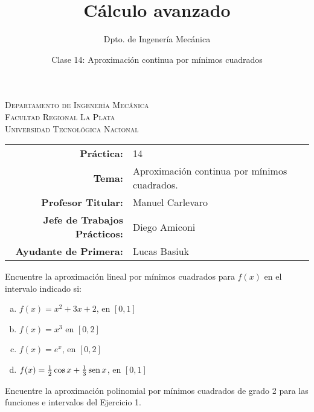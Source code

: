 \documentclass[11pt]{article}
\title{Cálculo avanzado}
\author{Dpto. de Ingenería Mecánica}
\date{Clase 14: Aproximación continua por mínimos cuadrados}
\begin{document}

\begin{center}
\end{center} 

\begin{center}
\vspace{\baselineskip}
\Large{\textsc{Departamento de Ingenería Mecánica}} \\
\textsc{Facultad Regional La Plata} \\
\textsc{Universidad Tecnológica Nacional}
\end{center}


\begin{center}
\begin{tabular}{r l}
    \textbf{Práctica:} & 14 \\
 \textbf{Tema:} & Aproximación continua por mínimos cuadrados. \\
 \textbf{Profesor Titular:} & Manuel Carlevaro \\
 \textbf{Jefe de Trabajos Prácticos:} & Diego Amiconi \\
 \textbf{Ayudante de Primera:} & Lucas Basiuk 
\end{tabular}\end{center}

\vspace{1em}

\begin{question} %
Encuentre la aproximación lineal por mínimos cuadrados para $f(x)$ en el intervalo indicado si:
\begin{enumerate}[a)]
    \item $f(x) = x^2 + 3 x + 2$, en $[0, 1]$
    \item $f(x) = x^3$ en $[0, 2]$
    \item $f(x) = e^x$, en $[0, 2]$
    \item $f(x) = \frac{1}{2} \cos x + \frac{1}{3} \operatorname{sen} x$, en $[0, 1]$
\end{enumerate}
\end{question}

\begin{question} %
    Encuentre la aproximación polinomial por mínimos cuadrados de grado 2 para las funciones e intervalos del Ejercicio 1.
\end{question}
\end{document}
